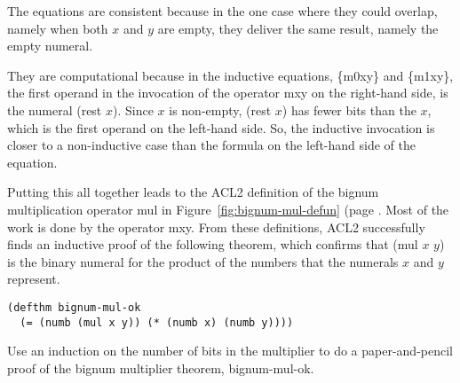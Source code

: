 The equations are consistent because in the one case
where they could overlap, namely when both $x$ and $y$
are empty, they deliver the same result, namely the empty numeral.

They are computational because in the inductive equations,
\{m0xy\} and \{m1xy\}, the first operand in
the invocation of the operator mxy on the right-hand side,
is the numeral (rest $x$). Since $x$ is non-empty, 
(rest $x$) has fewer bits than the $x$, which is the first operand
on the left-hand side. 
So, the inductive invocation is closer to a non-inductive
case than the formula on the left-hand side of the equation.

Putting this all together leads to the ACL2 definition
of the bignum multiplication operator mul in 
Figure~\ref{fig:bignum-mul-defun} (page \pageref{fig:bignum-mul-defun}.
Most of the work is done by the operator mxy.
From these definitions, ACL2 successfully finds an
inductive proof of the following theorem,
which confirms that (mul $x$ $y$) is the binary numeral
for the product of the numbers that the numerals $x$ and $y$ represent.

\label{bignum-mul-thm}
\begin{Verbatim}
(defthm bignum-mul-ok
  (= (numb (mul x y)) (* (numb x) (numb y))))
\end{Verbatim}

\begin{ExerciseList}
\Exercise
Use an induction on the number of bits in the
multiplier to do a paper-and-pencil proof of
the bignum multiplier theorem, bignum-mul-ok.
\end{ExerciseList}


